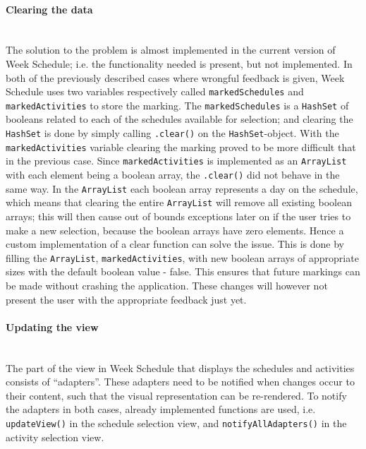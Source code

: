 \paragraph{Clearing the data}\hfill\\
The solution to the problem is almost implemented in the current version of Week Schedule; i.e. the functionality needed is present, but not implemented.
In both of the previously described cases where wrongful feedback is given, Week Schedule uses two variables respectively called \texttt{markedSchedules} and \texttt{markedActivities} to store the marking.
The \texttt{markedSchedules} is a \texttt{HashSet} of booleans related to each of the schedules available for selection; and clearing the \texttt{HashSet} is done by simply calling \texttt{.clear()} on the \texttt{HashSet}-object.
With the \texttt{markedActivities} variable clearing the marking proved to be more difficult that in the previous case.
Since \texttt{markedActivities} is implemented as an \texttt{ArrayList} with each element being a boolean array, the \texttt{.clear()} did not behave in the same way.
In the \texttt{ArrayList} each boolean array represents a day on the schedule, which means that clearing the entire \texttt{ArrayList} will remove all existing boolean arrays; this will then cause out of bounds exceptions later on if the user tries to make a new selection, because the boolean arrays have zero elements. 
Hence a custom implementation of a clear function can solve the issue.
This is done by filling the \texttt{ArrayList}, \texttt{markedActivities}, with new boolean arrays of appropriate sizes with the default boolean value - false.
This ensures that future markings can be made without crashing the application.
These changes will however not present the user with the appropriate feedback just yet.

\paragraph{Updating the view}\hfill\\
The part of the view in Week Schedule that displays the schedules and activities consists of \enquote{adapters}.
These adapters need to be notified when changes occur to their content, such that the visual representation can be re-rendered.
To notify the adapters in both cases, already implemented functions are used, i.e. \texttt{updateView()} in the schedule selection view, and \texttt{notifyAllAdapters()} in the activity selection view.

